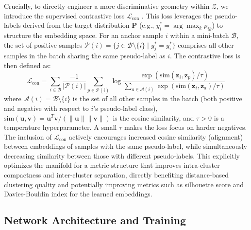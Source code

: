 \documentclass[journal]{IEEEtran}
\begin{document}
Crucially, to directly engineer a more discriminative geometry within $\mathcal{Z}$, we introduce the supervised contrastive loss $\mathcal{L}_{\text{con}}$ \cite{khosla2020supervised_contrastive}. This loss leverages the pseudo-labels derived from the target distribution $\mathbf{P}$ (e.g., $y_i^* = \arg\max_k p_{ik}$) to structure the embedding space. For an anchor sample $i$ within a mini-batch $\mathcal{B}$, the set of positive samples $\mathcal{P}(i) = \{j \in \mathcal{B} \setminus \{i\} \mid y_j^* = y_i^*\}$ comprises all other samples in the batch sharing the same pseudo-label as $i$. The contrastive loss is then defined as:
\begin{equation}
\mathcal{L}_{\text{con}} = \sum_{i \in \mathcal{B}} \frac{-1}{|\mathcal{P}(i)|} \sum_{p \in \mathcal{P}(i)} \log \frac{\exp(\text{sim}(\mathbf{z}_i, \mathbf{z}_p) / \tau)}{\sum_{a \in \mathcal{A}(i)} \exp(\text{sim}(\mathbf{z}_i, \mathbf{z}_a) / \tau)}
\label{eq:contrastive_loss_revised}
\end{equation}
where $\mathcal{A}(i) = \mathcal{B} \setminus \{i\}$ is the set of all other samples in the batch (both positive and negative with respect to $i$'s pseudo-label class), $\text{sim}(\mathbf{u}, \mathbf{v}) = \mathbf{u}^T \mathbf{v} / (\|\mathbf{u}\| \|\mathbf{v}\|)$ is the cosine similarity, and $\tau > 0$ is a temperature hyperparameter. A small $\tau$ makes the loss focus on harder negatives.
The inclusion of $\mathcal{L}_{\text{con}}$ actively encourages increased cosine similarity (alignment) between embeddings of samples with the same pseudo-label, while simultaneously decreasing similarity between those with different pseudo-labels. This explicitly optimizes the manifold for a metric structure that improves intra-cluster compactness and inter-cluster separation, directly benefiting distance-based clustering quality and potentially improving metrics such as silhouette score and Davies-Bouldin index for the learned embeddings.

\subsection{Network Architecture and Training}
\end{document}
